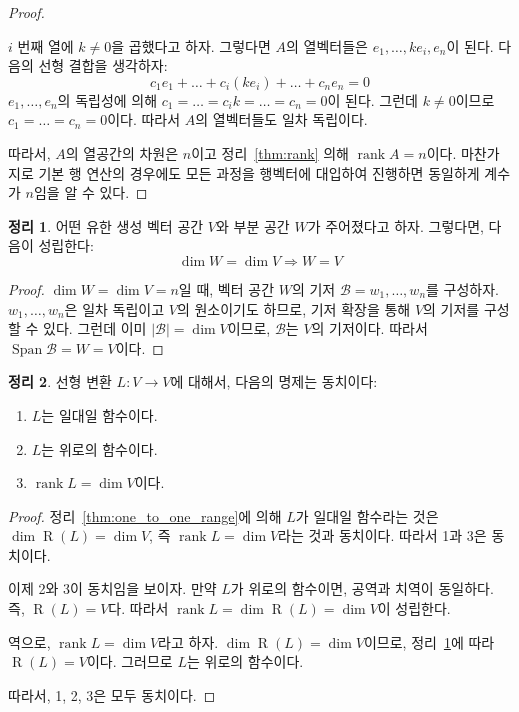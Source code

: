 \documentclass[unfonts,oneside,a4paper]{oblivoir}
\theoremstyle{definition}
\theoremstyle{theorem}
\newtheorem{theorem}{정리}
\theoremstyle{remark}
\theoremstyle{remark}
\theoremstyle{remark}
\theoremstyle{remark}
\renewcommand{\vec}[1]{\bm{\mathit{#1}}}
\newcommand{\vecz}{\bm{\mathrm{0}}}
\DeclareMathOperator{\Span}{Span}
\DeclareMathOperator{\Range}{R}
\DeclareMathOperator{\rank}{rank}
\begin{document}
\begin{proof}
\begin{enumerate}
            $i$ 번째 열에 $k \neq 0$을 곱했다고 하자.
            그렇다면 $A$의 열벡터들은 $\vec e_1, \dots, k \vec e_i, \vec e_n$이 된다.
            다음의 선형 결합을 생각하자:
            \begin{equation*}
                c_1 \vec e_1 + \dots + c_i (k \vec e_i) + \dots + c_n \vec e_n = \vecz
            \end{equation*}
            $\vec e_1, \dots, \vec e_n$의 독립성에 의해 $c_1 = \dots = c_i k = \dots = c_n = 0$이 된다.
            그런데 $k \neq 0$이므로 $c_1 = \dots = c_n = 0$이다.
            따라서 $A$의 열벡터들도 일차 독립이다.
    \end{enumerate}
    따라서, $A$의 열공간의 차원은 $n$이고 정리~\ref{thm:rank} 의해 $\rank A = n$이다.
    마찬가지로 기본 행 연산의 경우에도 모든 과정을 행벡터에 대입하여 진행하면 동일하게 계수가 $n$임을 알 수 있다.
\end{proof}

\begin{theorem}\label{thm17}
    어떤 유한 생성 벡터 공간 $V$와 부분 공간 $W$가 주어졌다고 하자.
    그렇다면, 다음이 성립한다:
    \begin{equation*}
        \dim W = \dim V \Rightarrow W = V
    \end{equation*}
\end{theorem}

\begin{proof}
    $\dim W = \dim V = n$일 때, 벡터 공간 $W$의 기저 $\mathcal B = \vec w_1, \dots, \vec w_n$를 구성하자.
    $\vec w_1, \dots, \vec w_n$은 일차 독립이고 $V$의 원소이기도 하므로, 기저 확장을 통해 $V$의 기저를 구성할 수 있다.
    그런데 이미 $|\mathcal B| = \dim V$이므로, $\mathcal B$는 $V$의 기저이다.
    따라서 $\Span \mathcal B = W = V$이다.
\end{proof}

\begin{theorem} \label{thm:onto}
    선형 변환 $L: V \rightarrow V$에 대해서, 다음의 명제는 동치이다:
    \begin{enumerate}
        \item $L$는 일대일 함수이다.
        \item $L$는 위로의 함수이다.
        \item $\rank L = \dim V$이다.
    \end{enumerate}
\end{theorem}

\begin{proof}
    정리~\ref{thm:one_to_one_range}에 의해 $L$가 일대일 함수라는 것은 $\dim \Range(L) = \dim V$, 즉 $\rank L = \dim V$라는 것과 동치이다.
    따라서 1과 3은 동치이다.

    이제 2와 3이 동치임을 보이자.
    만약 $L$가 위로의 함수이면, 공역과 치역이 동일하다.
    즉, $\Range(L) = V$다.
    따라서 $\rank L = \dim \Range(L) = \dim V$이 성립한다.

    역으로, $\rank L = \dim V$라고 하자.
    $\dim \Range(L) = \dim V$이므로, 정리~\ref{thm17}에 따라 $\Range(L) = V$이다.
    그러므로 $L$는 위로의 함수이다.

    따라서, 1, 2, 3은 모두 동치이다.
\end{proof}
\end{document}
